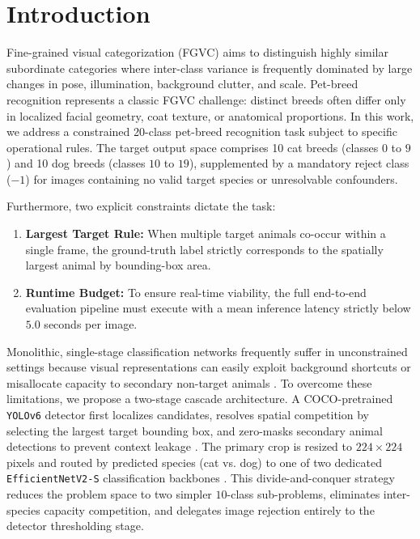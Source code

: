 \section{Introduction}
\label{sec:01_introdoction}

Fine-grained visual categorization (FGVC) aims to distinguish highly similar subordinate categories where inter-class variance is frequently dominated by large changes in pose, illumination, background clutter, and scale. Pet-breed recognition represents a classic FGVC challenge: distinct breeds often differ only in localized facial geometry, coat texture, or anatomical proportions. In this work, we address a constrained 20-class pet-breed recognition task subject to specific operational rules. The target output space comprises 10 cat breeds (classes $0$ to $9$) and 10 dog breeds (classes $10$ to $19$), supplemented by a mandatory reject class ($-1$) for images containing no valid target species or unresolvable confounders. 

Furthermore, two explicit constraints dictate the task:
\begin{enumerate}
    \item \textbf{Largest Target Rule:} When multiple target animals co-occur within a single frame, the ground-truth label strictly corresponds to the spatially largest animal by bounding-box area.
    \item \textbf{Runtime Budget:} To ensure real-time viability, the full end-to-end evaluation pipeline must execute with a mean inference latency strictly below $5.0$ seconds per image.
\end{enumerate}

Monolithic, single-stage classification networks frequently suffer in unconstrained settings because visual representations can easily exploit background shortcuts or misallocate capacity to secondary non-target animals \cite{geirhos2020shortcut}. To overcome these limitations, we propose a two-stage cascade architecture. A COCO-pretrained \texttt{YOLOv6} detector first localizes candidates, resolves spatial competition by selecting the largest target bounding box, and zero-masks secondary animal detections to prevent context leakage \cite{li2022yolov6, lin2014coco}. The primary crop is resized to $224\times224$ pixels and routed by predicted species (cat vs. dog) to one of two dedicated \texttt{EfficientNetV2-S} classification backbones \cite{tan2021efficientnetv2}. This divide-and-conquer strategy reduces the problem space to two simpler $10$-class sub-problems, eliminates inter-species capacity competition, and delegates image rejection entirely to the detector thresholding stage.


